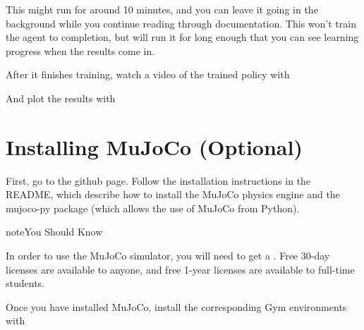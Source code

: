 \documentclass[letterpaper,10pt,english]{sphinxmanual}
\begin{document}
This might run for around 10 minutes, and you can leave it going in the background while you continue reading through documentation. This won’t train the agent to completion, but will run it for long enough that you can see  learning progress when the results come in.

After it finishes training, watch a video of the trained policy with

\begin{sphinxVerbatim}[commandchars=\\\{\}]
    
\end{sphinxVerbatim}

And plot the results with

\begin{sphinxVerbatim}[commandchars=\\\{\}]
    
\end{sphinxVerbatim}


\section{Installing MuJoCo (Optional)}
\label{\detokenize{user/installation:installing-mujoco-optional}}
First, go to the  github page. Follow the installation instructions in the README, which describe how to install the MuJoCo physics engine and the mujoco-py package (which allows the use of MuJoCo from Python).

\begin{sphinxadmonition}{note}{You Should Know}

In order to use the MuJoCo simulator, you will need to get a . Free 30-day licenses are available to anyone, and free 1-year licenses are available to full-time students.
\end{sphinxadmonition}

Once you have installed MuJoCo, install the corresponding Gym environments with

\begin{sphinxVerbatim}[commandchars=\\\{\}]
  \PYG{p}{[}\PYG{p}{]}
\end{sphinxVerbatim}
\end{document}
